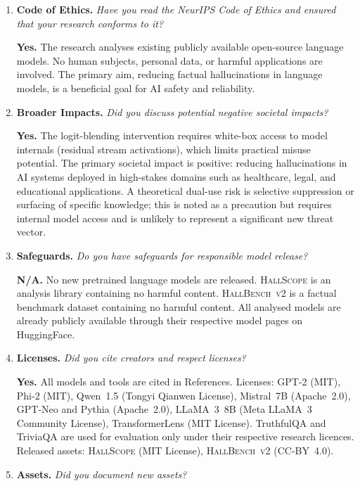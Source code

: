 \documentclass{article}
\begin{document}
{\begin{enumerate}[leftmargin=*,label=\arabic*.,itemsep=8pt]
\item \textbf{Code of Ethics.}
\textit{Have you read the NeurIPS Code of Ethics and ensured that your
research conforms to it?}

\textbf{Yes.}
The research analyses existing publicly available open-source language
models.
No human subjects, personal data, or harmful applications are involved.
The primary aim, reducing factual hallucinations in language models, is
a beneficial goal for AI safety and reliability.

\item \textbf{Broader Impacts.}
\textit{Did you discuss potential negative societal impacts?}

\textbf{Yes.}
The logit-blending intervention requires white-box access to model internals
(residual stream activations), which limits practical misuse potential.
The primary societal impact is positive: reducing hallucinations in AI
systems deployed in high-stakes domains such as healthcare, legal, and
educational applications.
A theoretical dual-use risk is selective suppression or surfacing of
specific knowledge; this is noted as a precaution but requires internal
model access and is unlikely to represent a significant new threat vector.

\item \textbf{Safeguards.}
\textit{Do you have safeguards for responsible model release?}

\textbf{N/A.}
No new pretrained language models are released.
\textsc{HallScope} is an analysis library containing no harmful content.
\textsc{HallBench~v2} is a factual benchmark dataset containing no harmful
content.
All analysed models are already publicly available through their respective
model pages on HuggingFace.

\item \textbf{Licenses.}
\textit{Did you cite creators and respect licenses?}

\textbf{Yes.}
All models and tools are cited in References.
Licenses: GPT-2 (MIT), Phi-2 (MIT), Qwen~1.5 (Tongyi Qianwen License),
Mistral~7B (Apache~2.0), GPT-Neo and Pythia (Apache~2.0), LLaMA~3~8B
(Meta LLaMA~3 Community License), TransformerLens (MIT License).
TruthfulQA and TriviaQA are used for evaluation only under their respective
research licences.
Released assets: \textsc{HallScope} (MIT License),
\textsc{HallBench~v2} (CC-BY~4.0).

\item \textbf{Assets.}
\textit{Did you document new assets?}


\end{enumerate}}
\end{document}
